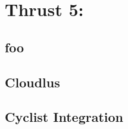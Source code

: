 \chapter{Thrust 5: }\label{chap:thrust5}

\section{foo} %

\section{Cloudlus}

\section{Cyclist Integration}
